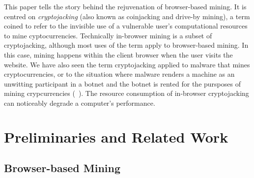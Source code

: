 This paper tells the story behind the rejuvenation of browser-based mining. It is centred on \textit{cryptojacking} (also known as coinjacking and drive-by mining), a term coined to refer to the invisible use of a vulnerable user's computational resources to mine cyptocurrencies. Technically in-browser mining is a subset of cryptojacking, although most uses of the term apply to browser-based mining. In this case, mining happens within the client browser when the user visits the website. We have also seen the term cryptojacking applied to malware that mines cryptocurrencies, or to the situation where malware renders a machine as an unwitting participant in a botnet and the botnet is rented for the pursposes of mining crypcurrencies (\cf~\cite{huang2014botcoin}). The resource consumption of in-browser cryptojacking can noticeably degrade a computer's performance.











\section{Preliminaries and Related Work}

\subsection{Browser-based Mining}

